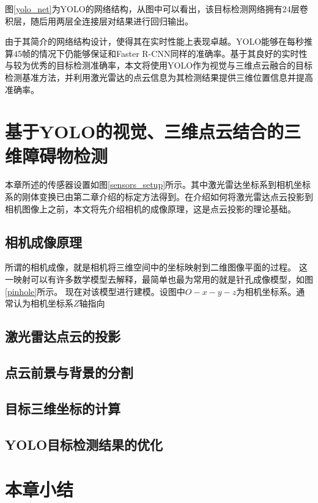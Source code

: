 
图\ref{yolo_net}为YOLO的网络结构，从图中可以看出，该目标检测网络拥有24层卷积层，随后用两层全连接层对结果进行回归输出。

由于其简介的网络结构设计，使得其在实时性能上表现卓越。YOLO能够在每秒推算45帧的情况下仍能够保证和Faster R-CNN同样的准确率。基于其良好的实时性与较为优秀的目标检测准确率，本文将使用YOLO作为视觉与三维点云融合的目标检测基准方法，并利用激光雷达的点云信息为其检测结果提供三维位置信息并提高准确率。

\section{基于YOLO的视觉、三维点云结合的三维障碍物检测}
本章所述的传感器设置如图\ref{sensors_setup}所示。其中激光雷达坐标系到相机坐标系的刚体变换已由第二章介绍的标定方法得到。在介绍如何将激光雷达点云投影到相机图像上之前，本文将先介绍相机的成像原理，这是点云投影的理论基础。


\subsection{相机成像原理}

所谓的相机成像，就是相机将三维空间中的坐标映射到二维图像平面的过程。
这一映射可以有许多数学模型去解释，最简单也最为常用的就是针孔成像模型，如图\ref{pinhole}所示。
现在对该模型进行建模。设图中$O-x-y-z$为相机坐标系。通常认为相机坐标系$Z$轴指向
\subsection{激光雷达点云的投影}

\subsection{点云前景与背景的分割}

\subsection{目标三维坐标的计算}

\subsection{YOLO目标检测结果的优化}




\section{本章小结}